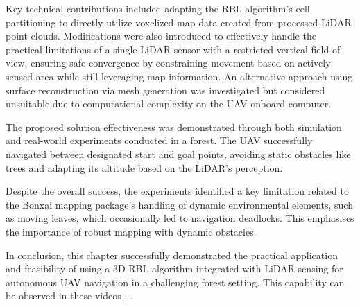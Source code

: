         Key technical contributions included adapting the \ac{RBL} algorithm's cell partitioning to directly utilize voxelized map data created from processed \ac{LiDAR} point clouds. 
        Modifications were also introduced to effectively handle the practical limitations of a single \ac{LiDAR} sensor with a restricted vertical field of view, ensuring safe convergence by constraining movement based on actively sensed area while still leveraging map information. 
        An alternative approach using surface reconstruction via mesh generation was investigated but considered unsuitable due to computational complexity on the \ac{UAV} onboard computer.

        The proposed solution effectiveness was demonstrated through both simulation and real-world experiments conducted in a forest. 
        The \ac{UAV} successfully navigated between designated start and goal points, avoiding static obstacles like trees and adapting its altitude based on the \ac{LiDAR}'s perception. 

        Despite the overall success, the experiments identified a key limitation related to the Bonxai mapping package's handling of dynamic environmental elements, such as moving leaves, which occasionally led to navigation deadlocks. 
        This emphasises the importance of robust mapping with dynamic obstacles.

        In conclusion, this chapter successfully demonstrated the practical application and feasibility of using a 3D \ac{RBL} algorithm integrated with \ac{LiDAR} sensing for autonomous \ac{UAV} navigation in a challenging forest setting. 
        This capability can be observed in these videos \cite{aggressive_flight}, \cite{conservative_flight}.



